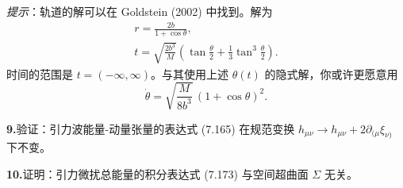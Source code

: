 \emph{提示}：轨道的解可以在 Goldstein (2002) 中找到。解为
\begin{gather*}
r = \frac{2b}{1+\cos\theta},\\
t = \sqrt{\frac{2b^3}{M}}\left(\tan\frac{\theta}{2} + \frac{1}{3}\tan^3\frac{\theta}{2}\right).
\end{gather*}
时间的范围是 $t = (-\infty, \infty)$。与其使用上述 $\theta(t)$ 的隐式解，你或许更愿意用
\begin{equation*}
\dot{\theta} = \sqrt{\frac{M}{8b^3}}\,(1+\cos\theta)^2.
\end{equation*}

\textbf{9.}\quad 验证：引力波能量-动量张量的表达式 (7.165) 在规范变换 $h_{\mu\nu} \to h_{\mu\nu} + 2\partial_{(\mu}\xi_{\nu)}$ 下不变。

\textbf{10.}\quad 证明：引力微扰总能量的积分表达式 (7.173) 与空间超曲面 $\Sigma$ 无关。
